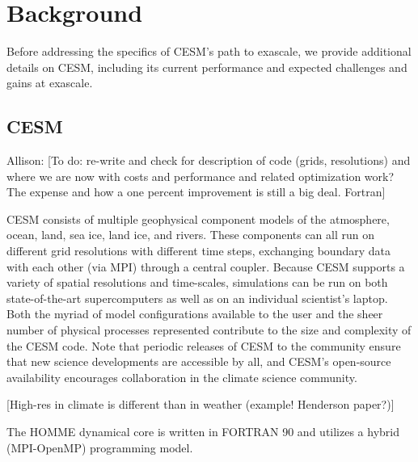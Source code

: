 
\section{Background}\label{sec:back}

Before addressing the specifics of CESM's path to exascale, we provide additional details on CESM, including its current performance and expected challenges and gains at exascale.
 
\subsection{CESM}

{\color{red} Allison:} [To do: re-write and check for description of code (grids, resolutions) and where we are now with costs and performance and related optimization work? The expense and how a one percent improvement is still a big deal.
Fortran]


CESM consists of multiple geophysical component models of the atmosphere, ocean, land, sea ice, land ice, and rivers.  These components can all run on different grid resolutions with different time steps, exchanging boundary data with each other (via MPI) through a central coupler.  Because CESM supports a variety of spatial resolutions and time-scales, simulations can be run on both state-of-the-art supercomputers as well as on an individual scientist's laptop.  Both the myriad of model configurations available to the user and the sheer number of physical processes represented contribute to the size and complexity of the CESM code.  Note that periodic releases of CESM to the community ensure that new science developments are accessible by all, and CESM's open-source availability encourages collaboration in the climate science community.

[High-res in climate is different than in weather (example! Henderson paper?)]

The HOMME dynamical core is written in FORTRAN 90 and utilizes a hybrid (MPI-OpenMP) programming model. 

